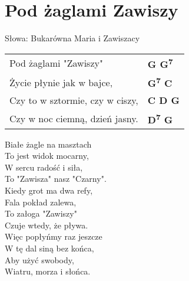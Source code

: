 \section{Pod żaglami Zawiszy}

Słowa:  Bukarówna Maria i Zawiszacy \\

\vspace{2em}
\begin{tabular}{@{}p{7cm}@{}l@{}}
Pod żaglami "Zawiszy" & \bfseries  G G\textsuperscript{7} \\
Życie płynie jak w bajce, & \bfseries  G\textsuperscript{7} C \\
Czy to w sztormie, czy w ciszy, & \bfseries C D G \\
Czy w noc ciemną, dzień jasny. & \bfseries  D\textsuperscript{7} G \\
\end{tabular}

\vspace{1em}
Białe żagle na masztach  \\
To jest widok mocarny, \\
W sercu radość i siła, \\
To "Zawisza" nasz "Czarny". \\

Kiedy grot ma dwa refy, \\
Fala pokład zalewa, \\
To załoga "Zawiszy" \\
Czuje wtedy, że pływa. \\

Więc popłyńmy raz jeszcze \\
W tę dal siną bez końca, \\
Aby użyć swobody, \\
Wiatru, morza i słońca. \\